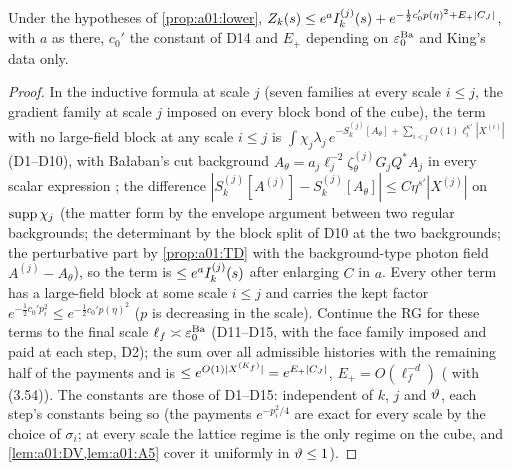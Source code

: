 \begin{proposition}\label{prop:a01:upper}
Under the hypotheses of \cref{prop:a01:lower}, $Z_{k}(s)\le e^{a}I^{(j)}_{k}(s)+e^{-\frac12c_0'p(\eta)^2+E_+|C_J|}$, with $a$ as there, $c_0'$ the constant of D14 and $E_+$ depending on $\varepsilon_0^{\mathrm{Ba}}$ and King's data only.
\end{proposition}
\begin{proof}
In the inductive formula \cite[(2.43)]{Ba2} at scale $j$ (seven families at every scale $i\le j$, the gradient family at scale $j$ imposed on every block bond of the cube), the term with no large-field block at any scale $i\le j$ is $\int\chi_j\lambda_j\,e^{-S^{(j)}_k[A_\theta]+\sum_{i<j}O(1)\ell_i^{\kappa'}|X^{(i)}|}$ (D1--D10), with Ba{\l}aban's cut background $A_\theta=a_j\ell_j^{-2}\zeta^{(j)}_\theta G_jQ^*A_j$ in every scalar expression \cite[(2.44), (2.50)]{Ba2}; the difference $|S^{(j)}_k[A^{(j)}]-S^{(j)}_k[A_\theta]|\le C\eta^{s'}|X^{(j)}|$ on $\operatorname{supp}\chi_j$ (the matter form by the envelope argument between two regular backgrounds; the determinant by the block split of D10 at the two backgrounds; the perturbative part by \cref{prop:a01:TD} with the background-type photon field $A^{(j)}-A_\theta$), so the term is $\le e^{a}I^{(j)}_{k}(s)$ after enlarging $C$ in $a$. Every other term has a large-field block at some scale $i\le j$ and carries the kept factor $e^{-\frac12c_0'p_i^2}\le e^{-\frac12c_0'p(\eta)^2}$ ($p$ is decreasing in the scale). Continue the RG for these terms to the final scale $\ell_f\asymp\varepsilon_0^{\mathrm{Ba}}$ (D11--D15, with the face family imposed and paid at each step, D2); the sum over all admissible histories with the remaining half of the payments and \cite[(3.54)]{Ba2} is $\le e^{O(1)|X^{(K_f)}|}=e^{E_+|C_J|}$, $E_+=O(\ell_f^{-d})$ (\cite[(2.117), (3.42)--(3.47)]{Ba2} with (3.54)). The constants are those of D1--D15: independent of $k$, $j$ and $\vartheta$, each step's constants being so (the payments $e^{-p_i^2/4}$ are exact for every scale by the choice of $\sigma_i$; at every scale the lattice regime is the only regime on the cube, and \cref{lem:a01:DV,lem:a01:A5} cover it uniformly in $\vartheta\le1$).
\end{proof}

